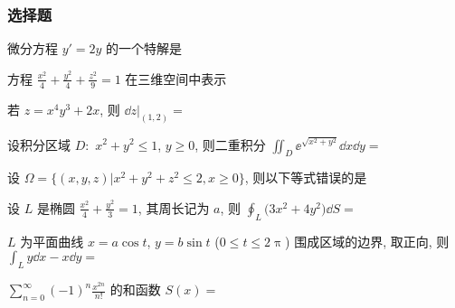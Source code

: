 \subsubsection{选择题}
\begin{ti}
	微分方程 $y' = 2y$ 的一个特解是 \kuo
\end{ti}

\begin{ti}
	方程 $\frac{x^2}{4} + \frac{y^2}{4} + \frac{z^2}{9} = 1$ 在三维空间中表示 \kuo
\end{ti}

\begin{ti}
	若 $z = x^4 y^3 + 2x$, 则 $\dd{z}|_{(1,2)} =$ \kuo
\end{ti}

\begin{ti}
	设积分区域 $D:$ $x^2+y^2 \leqslant 1$, $y \geqslant 0$, 则二重积分 $\iint_D \ee^{\sqrt{x^2 + y^2}} \dd{x} \dd{y} =$ \kuo
\end{ti}

\begin{ti}
	设 $\Omega = \bigl\{ (x,y,z) | x^2 + y^2 + z^2 \leqslant 2, x \geqslant 0 \bigr\}$, 则以下等式错误的是 \kuo
\end{ti}

\begin{ti}
	设 $L$ 是椭圆 $\frac{x^2}{4} + \frac{y^2}{3} = 1$, 其周长记为 $a$, 则 $\oint_L \bigl( 3x^2 + 4y^2 \bigr) \dd{S} =$ \kuo
\end{ti}

\begin{ti}
	$L$ 为平面曲线 $x = a \cos t$, $y = b \sin t$ ($0 \leqslant t \leqslant 2\uppi$) 围成区域的边界, 取正向, 则 $\int_L y \dd{x} - x \dd{y} =$ \kuo
\end{ti}

\begin{ti}
	$\sum_{n=0}^{\infty} (-1)^n \frac{x^{2n}}{n!}$ 的和函数 $S(x) =$ \kuo
\end{ti}

